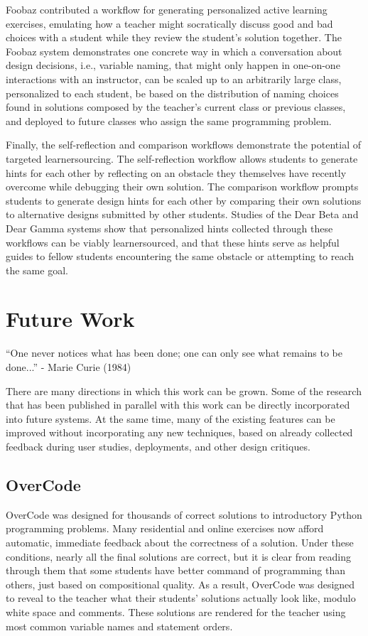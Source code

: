 Foobaz contributed a workflow for generating personalized active learning exercises, emulating how a teacher might socratically discuss good and bad choices with a student while they review the student's solution together. The Foobaz system demonstrates one concrete way in which a conversation about design decisions, i.e., variable naming, that might only happen in one-on-one interactions with an instructor, can be scaled up to an arbitrarily large class, personalized to each student, be based on the distribution of naming choices found in solutions composed by the teacher's current class or previous classes, and deployed to future classes who assign the same programming problem.

Finally, the self-reflection and comparison workflows demonstrate the potential of targeted learnersourcing. The self-reflection workflow allows students to generate hints for each other by reflecting on an obstacle they themselves have recently overcome while debugging their own solution. The comparison workflow prompts students to generate design hints for each other by comparing their own solutions to alternative designs submitted by other students. Studies of the Dear Beta and Dear Gamma systems show that personalized hints collected through these workflows can be viably learnersourced, and that these hints serve as helpful guides to fellow students encountering the same obstacle or attempting to reach the same goal.

\section{Future Work}
``One never notices what has been done; one can only see what remains to be done...'' - Marie Curie (1984)

There are many directions in which this work can be grown. Some of the research that has been published in parallel with this work can be directly incorporated into future systems. At the same time, many of the existing features can be improved without incorporating any new techniques, based on already collected feedback during user studies, deployments, and other design critiques.

\subsection{OverCode}

OverCode was designed for thousands of correct solutions to introductory Python programming problems. Many residential and online exercises now afford automatic, immediate feedback about the correctness of a solution. Under these conditions, nearly all the final solutions are correct, but it is clear from reading through them that some students have better command of programming than others, just based on compositional quality. As a result, OverCode was designed to reveal to the teacher what their students' solutions actually look like, modulo white space and comments. These solutions are rendered for the teacher using most common variable names and statement orders. 

